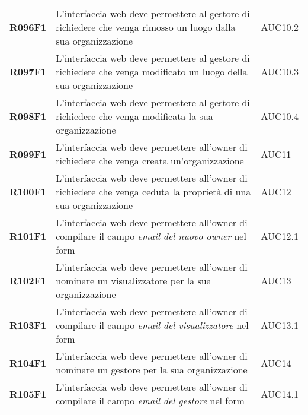 \documentclass[../analisi-dei-requisiti.tex]{subfiles}
\begin{document}
\begin{longtable}[H]{>{\centering\bfseries}m{3cm} >{\centering}m{10cm} >{\centering\arraybackslash}m{3cm}}
  R096F1                  & L'interfaccia web deve permettere al gestore di richiedere che venga rimosso un luogo dalla sua organizzazione                                 & AUC10.2                       \\
  R097F1                  & L'interfaccia web deve permettere al gestore di richiedere che venga modificato un luogo della sua organizzazione                              & AUC10.3                       \\
  R098F1                  & L'interfaccia web deve permettere al gestore di richiedere che venga modificata la sua organizzazione                                          & AUC10.4                       \\
  R099F1                  & L'interfaccia web deve permettere all'owner di richiedere che venga creata un'organizzazione                                                   & AUC11                         \\
  R100F1                  & L'interfaccia web deve permettere all'owner di richiedere che venga ceduta la proprietà di una sua organizzazione                              & AUC12                         \\
  R101F1                  & L'interfaccia web deve permettere all'owner di compilare il campo \textit{email del nuovo owner} nel form                                      & AUC12.1                       \\
  R102F1                  & L'interfaccia web deve permettere all'owner di nominare un visualizzatore per la sua organizzazione                                            & AUC13                         \\
  R103F1                  & L'interfaccia web deve permettere all'owner di compilare il campo \textit{email del visualizzatore} nel form                                   & AUC13.1                       \\
  R104F1                  & L'interfaccia web deve permettere all'owner di nominare un gestore per la sua organizzazione                                                   & AUC14                         \\
  R105F1                  & L'interfaccia web deve permettere all'owner di compilare il campo \textit{email del gestore} nel form                                          & AUC14.1                       \\
\end{longtable}
\end{document}
